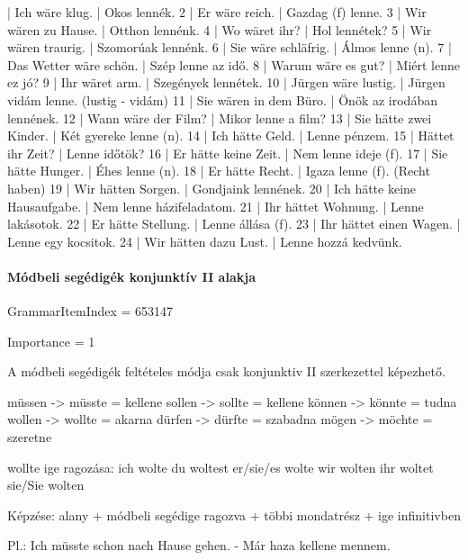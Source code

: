 \documentclass{article}
\newenvironment{desc}{\verbatim}{\endverbatim}
\newenvironment{exmp}{\verbatim}{\endverbatim}
\begin{document}
\begin{exmp}
1 | Ich wäre klug. | Okos lennék.
2 | Er wäre reich. | Gazdag (f) lenne.
3 | Wir wären zu Hause. | Otthon lennénk.
4 | Wo wäret ihr? | Hol lennétek?
5 | Wir wären traurig. | Szomorúak lennénk.
6 | Sie wäre schläfrig. | Álmos lenne (n).
7 | Das Wetter wäre schön. | Szép lenne az idő.
8 | Warum wäre es gut? | Miért lenne ez jó?
9 | Ihr wäret arm. | Szegények lennétek.
10 | Jürgen wäre lustig. | Jürgen vidám lenne. (lustig - vidám)
11 | Sie wären in dem Büro. | Önök az irodában lennének.
12 | Wann wäre der Film? | Mikor lenne a film?
13 | Sie hätte zwei Kinder. | Két gyereke lenne (n).
14 | Ich hätte Geld. | Lenne pénzem.
15 | Hättet ihr Zeit? | Lenne időtök?
16 | Er hätte keine Zeit. | Nem lenne ideje (f).
17 | Sie hätte Hunger. | Éhes lenne (n).
18 | Er hätte Recht. | Igaza lenne (f). (Recht haben)
19 | Wir hätten Sorgen. | Gondjaink lennének.
20 | Ich hätte keine Hausaufgabe. | Nem lenne házifeladatom.
21 | Ihr hättet Wohnung. | Lenne lakásotok.
22 | Er hätte Stellung. | Lenne állása (f).
23 | Ihr hättet einen Wagen. | Lenne egy kocsitok.
24 | Wir hätten dazu Lust. | Lenne hozzá kedvünk.
\end{exmp}

\paragraph{Módbeli segédigék konjunktív II alakja}

GrammarItemIndex = 653147

Importance = 1

\begin{desc}
A módbeli segédigék feltételes módja csak konjunktiv II szerkezettel képezhető.

müssen -> müsste = kellene
sollen -> sollte = kellene
können -> könnte = tudna
wollen -> wollte = akarna
dürfen -> dürfte = szabadna
mögen -> möchte = szeretne

wollte ige ragozása:
ich wolte
du woltest
er/sie/es wolte
wir wolten
ihr woltet
sie/Sie wolten

Képzése: alany + módbeli segédige ragozva + többi mondatrész + ige infinitivben

Pl.: Ich müsste schon nach Hause gehen. - Már haza kellene mennem.
\end{desc}
\end{document}
